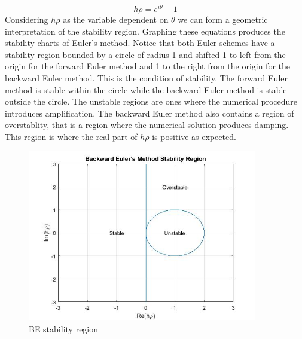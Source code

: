 \documentclass{article}
\begin{document}
				\begin{equation}
					 h\rho = e^{i\theta} - 1
				\end{equation}
Considering $h\rho$ as the variable dependent on $\theta$ we can form a geometric interpretation of the stability region. Graphing these equations produces the stability charts of Euler's method. Notice that both Euler schemes have a stability region bounded by a circle of radius 1 and shifted 1 to left from the origin for the forward Euler method and 1 to the right from the origin for the backward Euler method. This is the condition of stability. The forward Euler method is stable within the circle while the backward Euler method is stable outside the circle. The unstable regions are ones where the numerical procedure introduces amplification. The backward Euler method also contains a region of overstablity, that is a region where the numerical solution produces damping. This region is where the real part of $h\rho$ is positive as expected. 
				\begin{figure}[h!]
   					\centering
   					\includegraphics[width=100mm]{GraphEulerB.jpg}
					\centering
   					\caption{BE stability region}
				           \label{fig4}
  				\end{figure}
\end{document}
